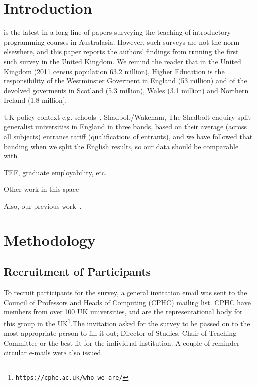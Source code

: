 \documentclass{sig-alternate}
\begin{document}
\section{Introduction}\label{intro}

\cite{mason+cooper:2014} is the latest in a long line \cite{deraadt-et-al:2004,mason-et-al:2012} of papers surveying the teaching of introductory programming courses in Australasia. However, such surveys are not the norm elsewhere, and this paper reports the authors' findings from running the first such survey in the United Kingdom. We remind the reader that in the United Kingdom (2011 census population 63.2 million), %
Higher Education is the responsibility of the Westminster Goverment in England (53 million) and of the devolved goverments in Scotland (5.3 million), Wales (3.1 million) and Northern Ireland (1.8 million).

UK policy context
e.g. schools~\cite{brown-et-al-sigcse2013,brown-et-al-toce2014},
Shadbolt/Wakeham,
The Shadbolt enquiry split generalist universities in England in three bands, based on their average (across all subjects) entrance tariff (qualifications of entrants), and we have followed that banding when we split the English results, so our data should be comparable with \cite{shadbolt:2016}

 TEF, graduate employability, etc.

Other work in this
space~\cite{mccracken-et-al:2001,gupta:2004,dale:2006,pears-et-al:2007,guo:2014}

Also, our previous work~\cite{crick-et-al-hea:2015,davenport-et-al:latice2016}.


\section{Methodology}\label{method}

\subsection{Recruitment of Participants}

To recruit participants for the survey, a general invitation email was sent to the Council of Professors and Heads of Computing (CPHC) mailing list. CPHC have members from over 100 UK universities, and are the representational body for this group in the UK\footnote{\texttt{https://cphc.ac.uk/who-we-are/}}.The invitation asked for the survey to be passed on to the most appropriate person to fill it out; Director of Studies, Chair of Teaching Committee or the best fit for the individual institution. A couple of reminder circular e-mails were also issued.
\end{document}
